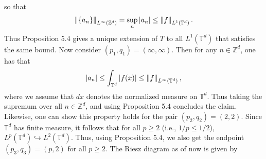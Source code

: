 \documentclass{article}
\begin{document}
\begin{enumerate}[itemsep =-2pt,label = (\alph{*})]
	so that 
	\begin{equation*}
		\left\Vert \{a_{n}\} \right\Vert_{L^{\infty}(\mathbb{Z}^{d})} = \sup_{n}|a_{n}| \leq \left\Vert f \right\Vert_{L^{1}(\mathbb{T}^{d})}. 
	\end{equation*} 
	Thus Proposition 5.4 gives a unique extension of $T$ to all $L^{1}(\mathbb{T}^{d})$ that satisfies the same bound. Now consider $(p_{1}, q_{1}) = (\infty, \infty)$. Then for any $n \in \mathbb{Z}^{d}$, one has that 
	\begin{equation*}
		|a_{n}| \leq \int_{\mathbb{T}^{d}}|f(x)| \leq \left\Vert f \right\Vert_{L^{\infty}(\mathbb{T}^{d})}, 
	\end{equation*}
	where we assume that $dx$ denotes the normalized measure on $\mathbb{T}^{d}$. Thus taking the supremum over all $n \in \mathbb{Z}^{d}$, and using Proposition 5.4 concludes the claim. Likewise, one can show this property holds for the pair $(p_{2},q_{2}) = (2, 2)$. Since $\mathbb{T}^{d}$ has finite measure, it follows that for all $p \geq 2$ (i.e., $1/p \leq 1/2$), $L^{p}(\mathbb{T}^{d}) \hookrightarrow L^{2}(\mathbb{T}^{d})$. Thus, using Proposition 5.4, we also get the endpoint $(p_{3},q_{3}) = (p, 2)$ for all $p \geq 2$. The Riesz diagram as of now is given by 
	\begin{figure}[h!]
		\centering 
	\end{figure}
\end{enumerate}
\end{document}
